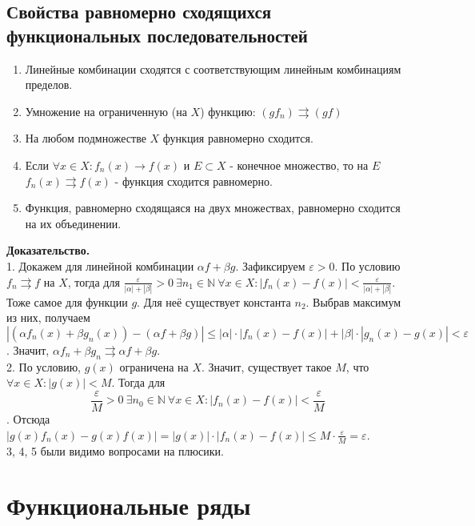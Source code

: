 \subsection{Свойства равномерно сходящихся функциональных последовательностей}
\begin{enumerate}
    \item Линейные комбинации сходятся с соответствующим линейным комбинациям
        пределов. 
    \item Умножение на ограниченную (на $X$) функцию:  $(gf_n)\rightrightarrows
        (gf)$
    \item На любом подмножестве $X$ функция равномерно сходится. 
    \item Если  $\forall x\in X: f_n(x)\to f(x)$ и $E\subset X$ - конечное 
        множество, то на $E$ $f_n(x)\rightrightarrows f(x)$ - 
        функция сходится равномерно.
    \item Функция, равномерно сходящаяся на двух множествах, равномерно
        сходится на их объединении.
\end{enumerate}
\textbf{Доказательство.}\\
1. Докажем для линейной комбинации $\alpha f+\beta g$. 
Зафиксируем $\varepsilon>0$. По условию $f_n\rightrightarrows f$ на $X$,
тогда для  $\frac{\varepsilon}{|\alpha|+|\beta|}>0~\exists n_1\in\mathbb{N}~
\forall x\in X:|f_n(x)-f(x)|<\frac{\varepsilon}{|\alpha|+|\beta|}$. 
Тоже самое для функции $g$. Для неё существует константа $n_2$. Выбрав 
максимум из них, получаем
$$|(\alpha f_n(x)+\beta g_n(x))-(\alpha f+\beta g)|\leqslant |\alpha|\cdot 
|f_n(x)-f(x)|+|\beta|\cdot |g_n(x)-g(x)|<\varepsilon$$.
Значит, $\alpha f_n+\beta g_n\rightrightarrows\alpha f+\beta g$.\\
2. По условию, $g(x)$ ограничена на  $X$. Значит, существует такое $M$, что
$\forall x\in X:|g(x)|<M$. Тогда для
$$\frac{\varepsilon}{M}>0~\exists n_0\in \mathbb{N}~\forall x\in X:
|f_n(x)-f(x)|<\frac{\varepsilon}{M}$$. 
Отсюда $|g(x)f_n(x)-g(x)f(x)|=|g(x)|\cdot |f_n(x)-f(x)|\leqslant M\cdot 
\frac{\varepsilon}{M}=\varepsilon$.\\
3, 4, 5 были видимо вопросами на плюсики. 



\section{Функциональные ряды}
